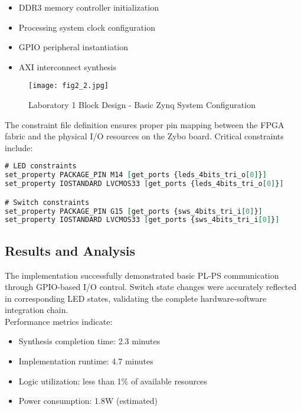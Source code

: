 \documentclass[11pt,a4paper]{article}
\begin{document}
\begin{itemize}[leftmargin=*]
    \item DDR3 memory controller initialization
    \item Processing system clock configuration
    \item GPIO peripheral instantiation
    \item AXI interconnect synthesis
\end{itemize}

\begin{figure}[H]
    \centering
    \texttt{[image: fig2\_2.jpg]}
    \caption{Laboratory 1 Block Design - Basic Zynq System Configuration}
    \label{fig:lab1_block}
\end{figure}

The constraint file definition ensures proper pin mapping between the FPGA fabric and the physical I/O resources on the Zybo board. Critical constraints include:

\begin{lstlisting}[language=VHDL, caption=Pin Constraint Example]
# LED constraints
set_property PACKAGE_PIN M14 [get_ports {leds_4bits_tri_o[0]}]
set_property IOSTANDARD LVCMOS33 [get_ports {leds_4bits_tri_o[0]}]

# Switch constraints  
set_property PACKAGE_PIN G15 [get_ports {sws_4bits_tri_i[0]}]
set_property IOSTANDARD LVCMOS33 [get_ports {sws_4bits_tri_i[0]}]
\end{lstlisting}

\subsection{Results and Analysis}

The implementation successfully demonstrated basic PL-PS communication through GPIO-based I/O control. Switch state changes were accurately reflected in corresponding LED states, validating the complete hardware-software integration chain.\\

Performance metrics indicate:
\begin{itemize}[leftmargin=*]
    \item Synthesis completion time: 2.3 minutes
    \item Implementation runtime: 4.7 minutes  
    \item Logic utilization: less than 1\% of available resources
    \item Power consumption: 1.8W (estimated)
\end{itemize}
\end{document}
